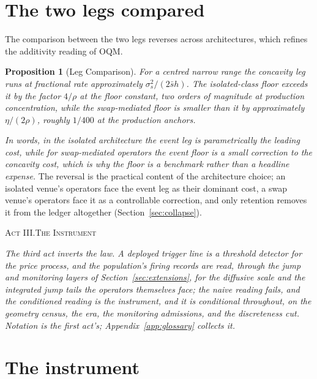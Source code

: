 \documentclass[11pt,a4paper]{article}
\theoremstyle{definition}
\theoremstyle{plain}
\newtheorem{proposition}{Proposition}
\theoremstyle{remark}
\newcommand{\actdivider}[2]{%
  \par\vspace{18pt plus 4pt minus 2pt}%
  \begin{center}{\fontsize{12.5pt}{15pt}\selectfont\scshape #1.\quad #2}\end{center}%
  \vspace{2pt}}
\begin{document}
\section{The two legs compared}\label{sec:legscompared}

The comparison between the two legs reverses across architectures, which refines the additivity reading of OQM.

\begin{proposition}[Leg Comparison]\label{prop:legs}
For a centred narrow range the concavity leg runs at fractional rate approximately $\sigma_s^2/(2 \bar s h)$. The isolated-class floor exceeds it by the factor $4/\rho$ at the floor constant, 
two orders of magnitude at production concentration, while the swap-mediated floor is smaller than it by approximately $\eta/(2\rho)$, roughly $1/400$ at the production anchors.
\end{proposition}

\emph{In words, in the isolated architecture the event leg is parametrically the leading cost, while for swap-mediated operators the event floor is a small correction to the concavity cost, 
which is why the floor is a benchmark rather than a headline expense.} The reversal is the practical content of the architecture choice; an isolated venue's operators face the event leg as 
their dominant cost, a swap venue's operators face it as a controllable correction, and only retention removes it from the ledger altogether (Section~\ref{sec:collapse}).

\actdivider{Act III}{The Instrument}

\noindent\emph{The third act inverts the law. A deployed trigger line is a threshold detector for the price process, and the population's firing records are read, through the jump and monitoring 
layers of Section~\ref{sec:extensions}, for the diffusive scale and the integrated jump tails the operators themselves face; the naive reading fails, and the conditioned reading is the 
instrument, and it is conditional throughout, on the geometry census, the era, the monitoring admissions, and the discreteness cut. Notation is the first act's; Appendix~\ref{app:glossary} collects it.}

\section{The instrument}\label{sec:instrument}
\end{document}
